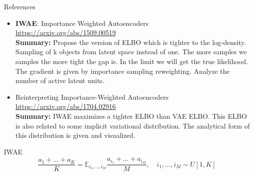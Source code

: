 \documentclass{beamer}
\begin{document}
\begin{frame}{References}
{\begin{itemize}
    \item \textbf{IWAE}: Importance Weighted Autoencoders \\
    \href{https://arxiv.org/abs/1509.00519}{https://arxiv.org/abs/1509.00519} \\
    \textbf{Summary:} Propose the version of ELBO which is tighter to the log-density. Sampling of k objects from latent space instead of one. The more samples we samples the more tight the gap is. In the limit we will get the true likelihood. The gradient is given by importance sampling reweighting. Analyze the number of active latent units.
    
    \item Reinterpreting Importance-Weighted Autoencoders \\
    \href{https://arxiv.org/abs/1704.02916}{https://arxiv.org/abs/1704.02916} \\
    \textbf{Summary:} IWAE maximizes a tighter ELBO than VAE ELBO. This ELBO is also related to some implicit variational distribution. The analytical form of this distribution is given and visualized. 
    
\end{itemize}
}
\end{frame}
\begin{frame}{IWAE}
\[
\frac{a_1 + \dots + a_K}{K} = \mathbb{E}_{i_1, \dots, i_M} \frac{a_{i_1} + \dots + a_{i_M}}{M}, \quad i_1, \dots, i_M \sim U[1, K]
\]
\end{frame}
\end{document}
